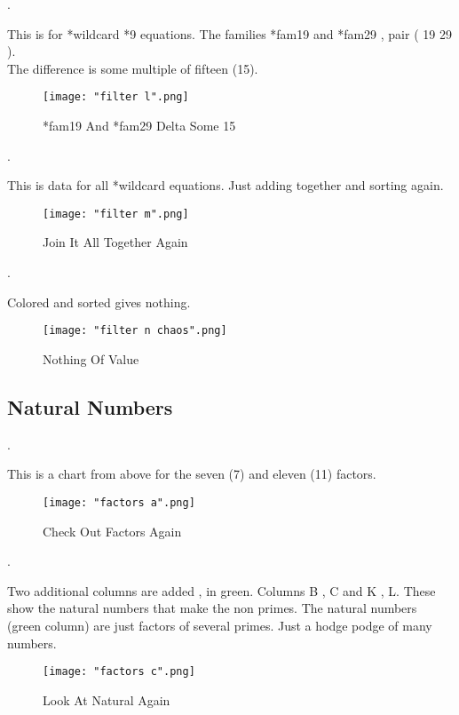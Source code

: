 \par 
.
\par 
This is for *wild\textendash card  *9 equations. The families *fam19 and *fam29 , pair ( 19 29 ). 
\\
The difference is some multiple of fifteen (15).
\begin{figure}[h]
    \centering
    \texttt{[image: "filter l".png]}
    \caption{*fam19 And *fam29 Delta Some 15}
\end{figure}
\pagebreak

\par 
.
\par 
This is data for all *wild\textendash card equations. Just adding together and sorting again. 
\\
\begin{figure}[h]
    \centering
    \texttt{[image: "filter m".png]}
    \caption{Join It All Together Again}
\end{figure}
\pagebreak

\par 
.
\par 
Colored and sorted gives nothing.
\\
\begin{figure}[h]
    \centering
    \texttt{[image: "filter n chaos".png]}
    \caption{Nothing Of Value}
\end{figure}
\pagebreak

\subsection{Natural Numbers}
.
\par 
This is a chart from above for the seven (7) and eleven (11) factors.
\begin{figure}[h]
    \centering
    \texttt{[image: "factors a".png]}
    \caption{Check Out Factors Again}
\end{figure}
\pagebreak





.
\\
\par 
Two additional columns are added , in green. Columns B , C and K , L. These show the natural numbers that make the non primes. The natural numbers (green column) are just factors of several primes. Just a hodge podge of many numbers.
\begin{figure}[h]
    \centering
    \texttt{[image: "factors c".png]}
    \caption{Look At Natural Again}
\end{figure}
\pagebreak


